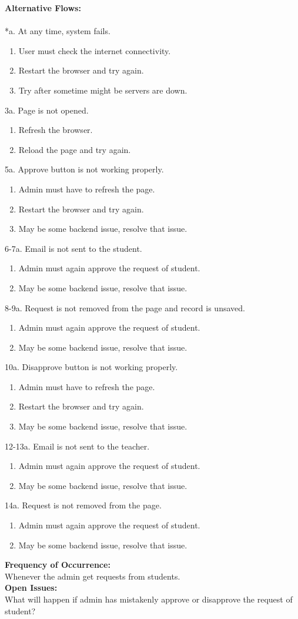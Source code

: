 \documentclass[12pt]{article}
\begin{document}
\textbf{Alternative Flows:}\\
\\
*a. At any time, system fails.
\begin{enumerate}
\item User must check the internet connectivity.
\item Restart the browser and try again.
\item Try after sometime might be servers are down.
\end{enumerate}
3a. Page is not opened.
\begin{enumerate}
\item Refresh the browser.
\item Reload the page and try again.
\end{enumerate}
5a. Approve button is not working properly.
\begin{enumerate}
\item Admin must have to refresh the page.
\item Restart the browser and try again.
\item May be some backend issue, resolve that issue.
\end{enumerate}
6-7a. Email is not sent to the student.
\begin{enumerate}
\item Admin must again approve the request of student.
\item May be some backend issue, resolve that issue.
\end{enumerate}
8-9a. Request is not removed from the page and record is unsaved.
\begin{enumerate}
\item Admin must again approve the request of student.
\item May be some backend issue, resolve that issue.
\end{enumerate}
10a. Disapprove button is not working properly.
\begin{enumerate}
\item Admin must have to refresh the page.
\item Restart the browser and try again.
\item May be some backend issue, resolve that issue.
\end{enumerate}
12-13a. Email is not sent to the teacher.
\begin{enumerate}
\item Admin must again approve the request of student.
\item May be some backend issue, resolve that issue.
\end{enumerate}
14a. Request is not removed from the page.
\begin{enumerate}
\item Admin must again approve the request of student.
\item May be some backend issue, resolve that issue.
\end{enumerate}
\textbf{Frequency of Occurrence:}\\
Whenever the admin get requests from students.
\\
\textbf{Open Issues:}\\
What will happen if admin has mistakenly approve or disapprove the request of student?
\end{document}
